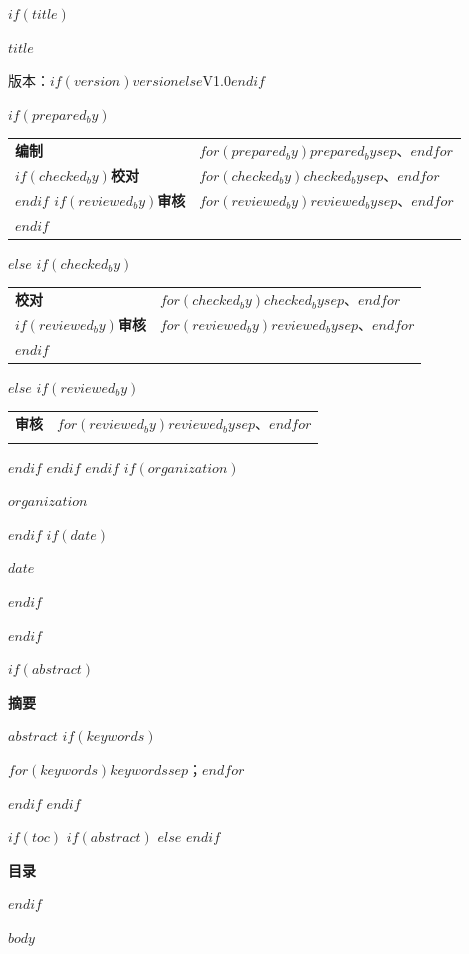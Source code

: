 \documentclass[UTF8,a4paper,zihao=-4]{ctexart}
\numberwithin{figure}{section}
\numberwithin{table}{section}
\numberwithin{equation}{section}
\begin{document}
$if(title)$
\begin{titlepage}
\thispagestyle{empty}
\centering
\vspace*{48mm}
{\sffamily\bfseries $title$\par}
\vspace{10mm}
{ 版本：$if(version)$$version$$else$V1.0$endif$\par}
\vspace{32mm}
$if(prepared_by)$
\begin{tabular}{>{\sffamily\bfseries}p{22mm} p{70mm}}
编制 & $for(prepared_by)$$prepared_by$$sep$、$endfor$ \\\addlinespace[5pt]
$if(checked_by)$校对 & $for(checked_by)$$checked_by$$sep$、$endfor$ \\\addlinespace[5pt]$endif$
$if(reviewed_by)$审核 & $for(reviewed_by)$$reviewed_by$$sep$、$endfor$ \\\addlinespace[5pt]$endif$
\end{tabular}
$else$
$if(checked_by)$
\begin{tabular}{>{\sffamily\bfseries}p{22mm} p{70mm}}
校对 & $for(checked_by)$$checked_by$$sep$、$endfor$ \\\addlinespace[5pt]
$if(reviewed_by)$审核 & $for(reviewed_by)$$reviewed_by$$sep$、$endfor$ \\\addlinespace[5pt]$endif$
\end{tabular}
$else$
$if(reviewed_by)$
\begin{tabular}{>{\sffamily\bfseries}p{22mm} p{70mm}}
审核 & $for(reviewed_by)$$reviewed_by$$sep$、$endfor$ \\\addlinespace[5pt]
\end{tabular}
$endif$
$endif$
$endif$
\vfill
$if(organization)$
{ $organization$\par}
\vspace{4mm}
$endif$
$if(date)$
{ $date$\par}
$endif$
\end{titlepage}
\clearpage
$endif$

$if(abstract)$
\pagestyle{plain}
\thispagestyle{plain}
\begin{center}
{\sffamily\bfseries 摘要}
\end{center}
\vspace{6pt}
$abstract$
$if(keywords)$
\vspace{8pt}
\par{}\par
\noindent $for(keywords)$$keywords$$sep$；$endfor$\par
$endif$
\clearpage
$endif$

$if(toc)$
$if(abstract)$
\pagestyle{plain}
$else$
\pagestyle{plain}
$endif$
\begin{center}
{\sffamily\bfseries 目录}
\end{center}
\vspace{6pt}
{\linespread{1.15}\selectfont\makeatletter{}\makeatother}
\clearpage
{}
\pagestyle{fancy}
$endif$

$body$
\end{document}
